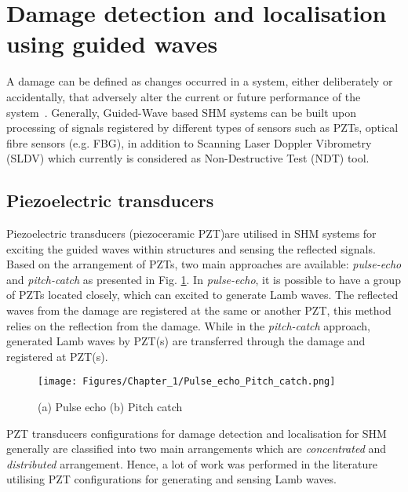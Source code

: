 \section[Damage identification]{Damage detection and localisation using guided waves}
\label{sec13}

A damage can be defined as changes occurred in a system, either deliberately or accidentally, that adversely alter the current or future performance of the system~\cite{Farrar2012}. 
Generally, Guided-Wave based SHM systems can be built upon processing of signals registered by different types of sensors such as PZTs, optical fibre sensors (e.g. FBG), in addition to Scanning Laser Doppler Vibrometry (SLDV) which currently is considered as Non-Destructive Test (NDT) tool.
\subsection{Piezoelectric transducers} 
Piezoelectric transducers (piezoceramic PZT)are utilised in SHM systems for exciting the guided waves within structures and sensing the reflected signals. 
Based on the arrangement of PZTs, two main approaches are available: \emph{pulse-echo} and \emph{pitch-catch} as presented in Fig. \ref{fig:Pulse_echo_Pitch_catch}.
In \emph{pulse-echo}, it is possible to have a group of PZTs located closely, which can excited to generate Lamb waves. 
The reflected waves from the damage are registered at the same or another PZT, this method relies on the reflection from the damage. 
While in the \emph{pitch-catch} approach, generated Lamb waves by PZT(s) are transferred through the damage and registered at PZT(s).
\begin{figure}[!ht]
	\begin{center}
		\centering
		\texttt{[image: Figures/Chapter\_1/Pulse\_echo\_Pitch\_catch.png]}
	\end{center}
	\caption{(a) Pulse echo	(b) Pitch catch} 
	\label{fig:Pulse_echo_Pitch_catch}
\end{figure}
PZT transducers configurations for damage detection and localisation for SHM generally are classified into two main arrangements which are \emph{concentrated} and \emph{distributed} arrangement. 
Hence, a lot of work was performed in the literature utilising PZT configurations for generating and sensing  Lamb waves.

